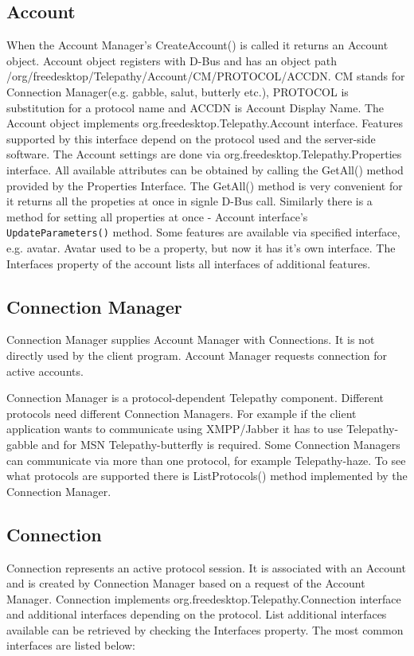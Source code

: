 \subsection*{Account}
When the Account Manager's CreateAccount() is called it returns an Account object. Account object registers with D-Bus and has an object path /org/freedesktop/Telepathy/Account/CM/PROTOCOL/ACCDN. CM stands for Connection Manager(e.g. gabble, salut, butterly etc.), PROTOCOL is substitution for a protocol name and ACCDN is Account Display Name. The Account object implements org.freedesktop.Telepathy.Account interface. Features supported by this interface depend on the protocol used and the server-side software. The Account settings are done via org.freedesktop.Telepathy.Properties interface. All available attributes can be obtained by calling the GetAll() method provided by the Properties Interface. The GetAll() method is very convenient for it returns all the propeties at once in signle D-Bus call. Similarly there is a method for setting all properties at once - Account interface's \verb|UpdateParameters()| method. Some features are available via specified interface, e.g. avatar. Avatar used to be a property, but now it has it's own interface. The Interfaces property of the account lists all interfaces of additional features.\cite{TPWiki}

\subsection*{Connection Manager}
Connection Manager supplies Account Manager with Connections. It is not directly used by the client program. Account Manager requests connection for active accounts.

Connection Manager is a protocol-dependent Telepathy component. Different protocols need different Connection Managers. For example if the client application wants to communicate using XMPP/Jabber it has to use Telepathy-gabble and for MSN Telepathy-butterfly is required. Some Connection Managers can communicate via more than one protocol, for example Telepathy-haze. To see what protocols are supported there is ListProtocols() method implemented by the Connection Manager.\cite{TPWiki}

\subsection*{Connection}
Connection represents an active protocol session. It is associated with an Account and is created by Connection Manager based on a request of the Account Manager. Connection implements org.freedesktop.Telepathy.Connection interface and additional interfaces depending on the protocol. List additional interfaces available can be retrieved by checking the Interfaces property. The most common interfaces are listed below\cite{TPWiki}:

